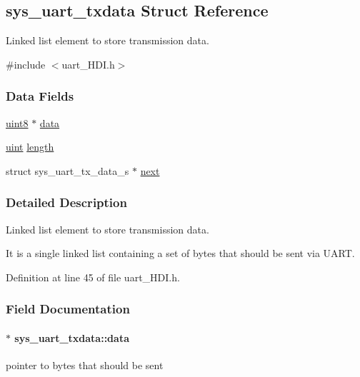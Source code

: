 \hypertarget{structsys__uart__txdata}{}\subsection{sys\+\_\+uart\+\_\+txdata Struct Reference}
\label{structsys__uart__txdata}


Linked list element to store transmission data.  




{\ttfamily \#include $<$uart\+\_\+\+H\+D\+I.\+h$>$}

\subsubsection*{Data Fields}
\begin{DoxyCompactItemize}
\item 
\hyperlink{definitions_8h_adde6aaee8457bee49c2a92621fe22b79}{uint8} $\ast$ \hyperlink{structsys__uart__txdata_aff4fde7bf4b3b6f3d88dc39727685dae}{data}
\item 
\hyperlink{definitions_8h_a1445ebbbf93d62972255ec5e89a5ab01}{uint} \hyperlink{structsys__uart__txdata_ae3cfb063b546b81d0755cd3a38128a7b}{length}
\item 
struct sys\+\_\+uart\+\_\+tx\+\_\+data\+\_\+s $\ast$ \hyperlink{structsys__uart__txdata_a6973ea48e25f4d9abaed720cad5f0212}{next}
\end{DoxyCompactItemize}


\subsubsection{Detailed Description}
Linked list element to store transmission data. 

It is a single linked list containing a set of bytes that should be sent via U\+A\+R\+T. 

Definition at line 45 of file uart\+\_\+\+H\+D\+I.\+h.



\subsubsection{Field Documentation}
\hypertarget{structsys__uart__txdata_aff4fde7bf4b3b6f3d88dc39727685dae}{}
\paragraph[{data}]{$\ast$ sys\+\_\+uart\+\_\+txdata\+::data}\label{structsys__uart__txdata_aff4fde7bf4b3b6f3d88dc39727685dae}
pointer to bytes that should be sent 

